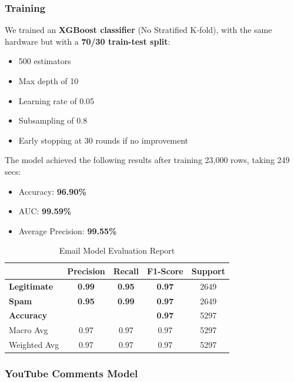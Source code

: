 \documentclass{article}
\begin{document}
\subsubsection*{Training}
We trained an \textbf{XGBoost classifier} (No Stratified K-fold), with the same hardware but with a \textbf{70/30 train-test split}:

\begin{itemize}
    \item 500 estimators
    \item Max depth of 10
    \item Learning rate of 0.05
    \item Subsampling of 0.8
    \item Early stopping at 30 rounds if no improvement
\end{itemize}

\noindent
The model achieved the following results after training 23,000 rows, taking 249 secs:

\begin{itemize}
    \item Accuracy: \textbf{96.90\%}
    \item AUC: \textbf{99.59\%}
    \item Average Precision: \textbf{99.55\%}
\end{itemize}

\begin{table}[htbp]
    \centering
    \caption{Email Model Evaluation Report}
    \begin{tabular}{l c c c c}
    \toprule
     & \textbf{Precision} & \textbf{Recall} & \textbf{F1-Score} & Support \\
    \midrule
    \textbf{Legitimate} & \textbf{0.99} & \textbf{0.95} & \textbf{0.97} & 2649 \\
    \textbf{Spam} & \textbf{0.95} & \textbf{0.99} & \textbf{0.97} & 2649 \\
    \midrule
    \textbf{Accuracy}  & & & \textbf{0.97} & 5297 \\
    Macro Avg & 0.97 & 0.97 & 0.97 & 5297 \\
    Weighted Avg & 0.97 & 0.97 & 0.97 & 5297 \\
    \bottomrule
    \end{tabular}
    \label{tab:xgboost_evaluation}
\end{table}


\subsubsection{YouTube Comments Model}
\end{document}
